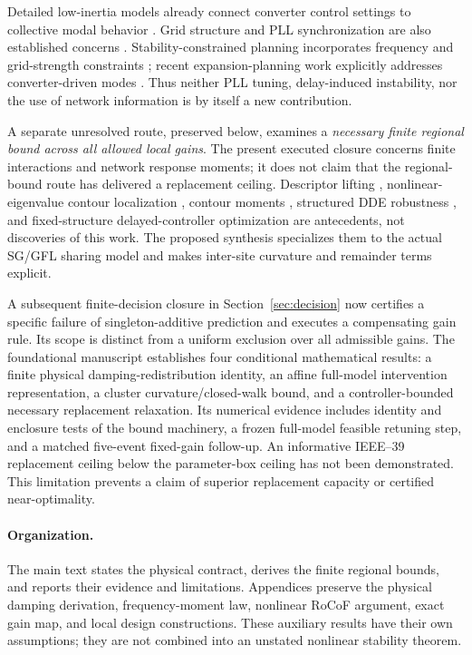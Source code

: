 \documentclass[11pt]{article}
\begin{document}
Detailed low-inertia models already connect converter control settings
to collective modal behavior \cite{markovic}. Grid structure and PLL
synchronization are also established concerns \cite{huang}.
Stability-constrained planning incorporates frequency and grid-strength
constraints \cite{chuteng}; recent expansion-planning work explicitly
addresses converter-driven modes \cite{jia}. Thus neither PLL tuning,
delay-induced instability, nor the use of network information is by
itself a new contribution.

A separate unresolved route, preserved below, examines a \emph{necessary
finite regional bound across all allowed local gains}. The present executed
closure concerns finite interactions and network response moments; it does
not claim that the regional-bound route has delivered a replacement ceiling.
Descriptor lifting \cite{peaucelle}, nonlinear-eigenvalue contour
localization \cite{bindel}, contour moments \cite{beyn}, structured
DDE robustness \cite{borgioli}, and fixed-structure delayed-controller
optimization \cite{michielsdesign} are antecedents, not discoveries
of this work. The proposed synthesis specializes them to the actual
SG/GFL sharing model and makes inter-site curvature and remainder
terms explicit.

A subsequent finite-decision closure in Section~\ref{sec:decision} now certifies a specific failure of singleton-additive prediction and executes a compensating gain rule. Its scope is distinct from a uniform exclusion over all admissible gains. The foundational manuscript establishes four conditional mathematical results:
a finite physical damping-redistribution identity, an affine full-model
intervention representation, a cluster curvature/closed-walk bound,
and a controller-bounded necessary replacement relaxation. Its numerical evidence includes identity and enclosure tests of the
bound machinery, a frozen full-model feasible retuning step, and a
matched five-event fixed-gain follow-up. An informative
IEEE--39 replacement ceiling below the parameter-box ceiling has not
been demonstrated. This limitation prevents a claim of superior
replacement capacity or certified near-optimality.

\paragraph{Organization.}
The main text states the physical contract, derives the finite
regional bounds, and reports their evidence and limitations.
Appendices preserve the physical damping derivation, frequency-moment
law, nonlinear RoCoF argument, exact gain map, and local design
constructions. These auxiliary results have their own assumptions;
they are not combined into an unstated nonlinear stability theorem.
\end{document}
